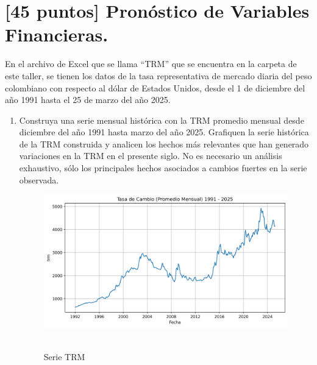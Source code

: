 \documentclass{article}
\theoremstyle{remark}
\theoremstyle{definition}
\begin{document}
\section{[45 puntos] Pron\'ostico de Variables Financieras.}

{En el archivo de Excel que se llama ``TRM'' que se encuentra en la carpeta de este taller, se tienen los datos de la tasa representativa de mercado diaria del peso colombiano con respecto al d\'olar de Estados Unidos, desde el 1 de diciembre del año 1991 hasta el 25 de marzo del año 2025.}

\begin{enumerate}[label = \emph{\alph*})]
    \item {Construya una serie mensual hist\'orica con la TRM promedio mensual desde diciembre del año 1991 hasta marzo del año 2025. Grafiquen la serie hist\'orica de la TRM construida y analicen los hechos m\'as relevantes que han generado variaciones en la TRM en el presente siglo. No es necesario un an\'alisis exhaustivo, s\'olo los principales hechos asociados a cambios fuertes en la serie observada.}
        \begin{tcolorbox}[title=Soluci\'on 2.a]
            \begin{figure}[H]
                \centering
                \includegraphics[width=0.9\linewidth]{output/graf_trm.png}\
                \caption{Serie TRM}
                \label{fig:serie_trm}
            \end{figure}


\end{tcolorbox}
\end{enumerate}
\end{document}
